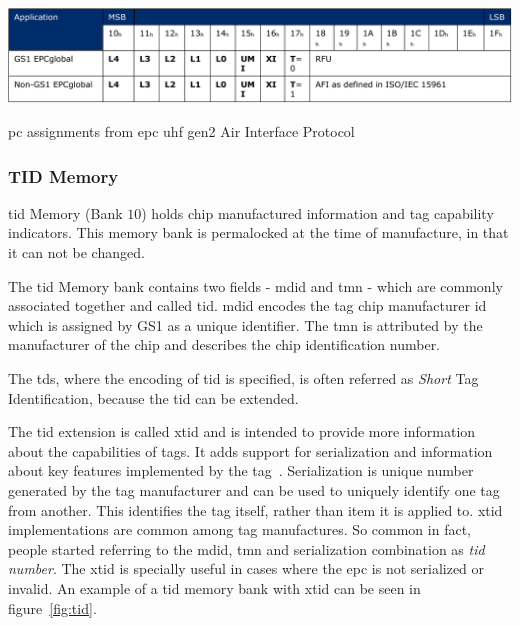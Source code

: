 \begin{table}
    \centering
    \includegraphics[width=\textwidth]{./figs/02-state-of-the-art/table_pcbits.pdf}
    \caption[\ac{pc} assignments from \ac{epc} \ac{uhf} \ac{gen2} Air Interface Protocol]{\ac{pc} assignments from \ac{epc} \ac{uhf} \ac{gen2} Air Interface Protocol~\cite{UHFGen2Tag}} 
    \label{tab:pcbits}
\end{table}

\subsubsection{TID Memory}

\ac{tid} Memory (Bank $10$) holds chip manufactured information and tag capability indicators. This memory bank is permalocked at the time of manufacture, in that it can not be changed.

The \ac{tid} Memory bank contains two fields - \ac{mdid} and \ac{tmn} - which are commonly associated together and called \ac{tid}.
\ac{mdid} encodes the tag chip manufacturer \ac{id} which is assigned by GS1 as a unique identifier.
The \ac{tmn} is attributed by the manufacturer of the chip and describes the chip identification number.

The \ac{tds}, where the encoding of \ac{tid} is specified, is often referred as \emph{Short} Tag Identification, because the \ac{tid} can be extended.

The \ac{tid} extension is called \ac{xtid} and is intended to provide more information about the capabilities of tags. It adds support for serialization and information about key features implemented by the tag~\cite{EPCTagData}.
Serialization is unique number generated by the tag manufacturer and can be used to uniquely identify one tag from another.
This identifies the tag itself, rather than item it is applied to.
\ac{xtid} implementations are common among tag manufactures. So common in fact, people started referring to the \ac{mdid}, \ac{tmn} and serialization  combination as \emph{\ac{tid} number}.
The \ac{xtid} is specially useful in cases where the \ac{epc} is not serialized or invalid.
An example of a \ac{tid} memory bank with \ac{xtid} can be seen in figure~\ref{fig:tid}.

